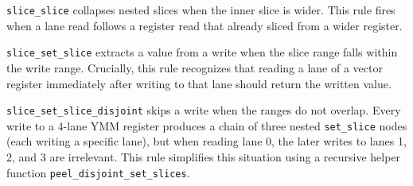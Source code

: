 \texttt{slice\_slice} collapses nested slices when the inner slice is wider.
This rule fires when a lane read follows a register read that already sliced from a wider register.



\texttt{slice\_set\_slice} extracts a value from a write when the slice range falls within the write range. Crucially, this rule recognizes that reading a lane of a vector register immediately after writing to that lane should return the written value.


\texttt{slice\_set\_slice\_disjoint} skips a write when the ranges do not overlap.
Every write to a 4-lane YMM register produces a chain of three nested \texttt{set\_slice} nodes (each writing a specific lane), but when reading lane 0, the later writes to lanes 1, 2, and 3 are irrelevant. This rule simplifies this situation using a recursive helper function \texttt{peel\_disjoint\_set\_slices}.




